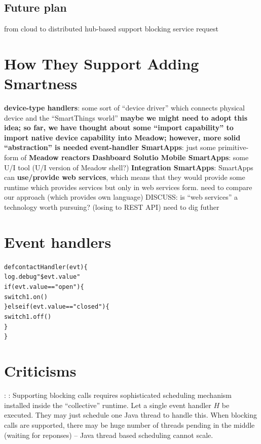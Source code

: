 \documentclass{myproc}
\begin{document}
\subsection{Future plan}
\bit
\w from cloud to distributed hub-based
\w support blocking service request
\eit


\section{How They Support Adding Smartness}
\bit
\w \textcolor{red2}{\bf{device-type handlers}}:  some sort of ``device
driver'' which connects physical device and the ``SmartThings world''
   \bit
   \w \textcolor{blue2}{\bf{}maybe we might need to adopt this idea; so far,
   we have thought about some ``import capability'' to import native device
   capability into Meadow; however, more solid ``abstraction'' is needed}
   \eit
\w \textcolor{red2}{\bf{}event-handler SmartApps}: just some primitive-form of
\textcolor{blue2}{\bf{}Meadow reactors} 
\w \textcolor{red2}{\bf{}Dashboard Solutio Mobile SmartApps}: some U/I tool
   (U/I version of Meadow shell?)
\w \textcolor{red2}{\bf{}Integration SmartApps}: SmartApps can
\textcolor{blue2}{\bf{}use/provide web services}, which means that they would
  provide some runtime which provides services but only in web services form.
  \bit
  \w need to compare our approach (which provides own language)
  \w DISCUSS: is ``web services'' a technology worth pursuing? (losing to REST
  API) 
  \w need to dig futher
  \eit
\eit

\section{Event handlers}

\begin{alltt}
\textcolor{red2}{def contactHandler(evt) \{
  log.debug "\$evt.value"
  if (evt.value == "open") \{
    switch1.on()
  \} else if (evt.value == "closed") \{
    switch1.off()
  \}
\}}
\end{alltt}

\section{Criticisms}
\bit
\w {}
\w {}
\w {}: 
\w {}:
  Supporting blocking calls requires sophisticated scheduling mechanism
  installed inside the ``collective'' runtime.
  Let a single event handler $H$ be executed. They may just schedule one
  Java thread to handle this. When blocking calls are supported, there may be
  huge number of threads pending in the middle (waiting for reponses) -- Java
  thread based scheduling cannot scale.
\eit
\end{document}
